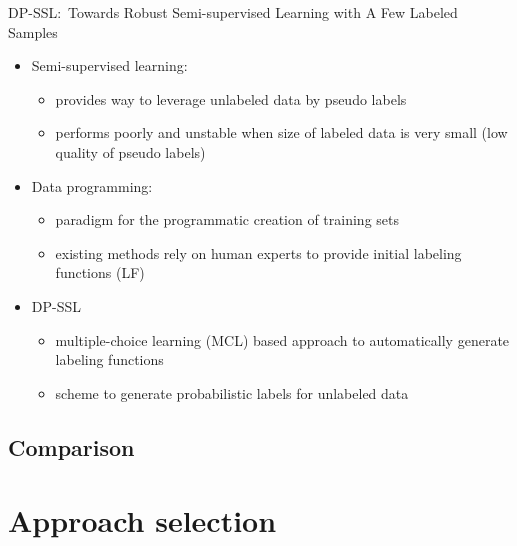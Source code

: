 DP-SSL:\ Towards Robust Semi-supervised Learning with A Few Labeled Samples~\cite{xu_dp-ssl_2021}
\begin{itemize}
    \item Semi-supervised learning:
        \begin{itemize}
            \item provides way to leverage unlabeled data by pseudo labels
            \item performs poorly and unstable when size of labeled data is very small (low quality
                of pseudo labels)
        \end{itemize}
    \item Data programming:
        \begin{itemize}
            \item paradigm for the programmatic creation of training sets
            \item existing methods rely on human experts to provide initial labeling functions (LF)
        \end{itemize}
    \item DP-SSL
        \begin{itemize}
            \item multiple-choice learning (MCL) based approach to automatically generate labeling functions
            \item scheme to generate probabilistic labels for unlabeled data
        \end{itemize}
\end{itemize}



\subsection{Comparison}

\section{Approach selection}
